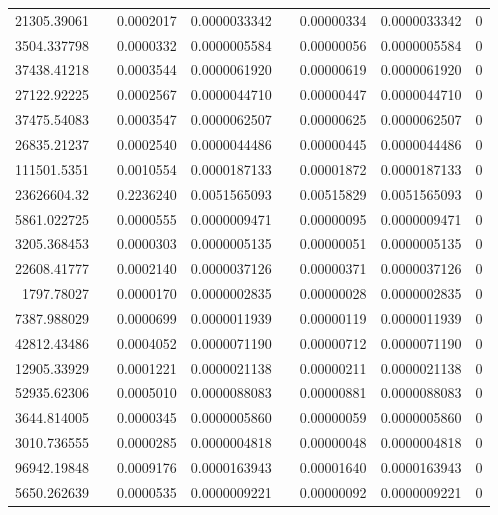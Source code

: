 \documentclass[
journal=jacsat, %
manuscript=article]{achemso}
\begin{document}
\begin{table}[htbp]
{\begin{tabular}{rrrrrrrr}
    21305.39061 &       & 0.0002017 & 0.0000033342 &       & 0.00000334 & 0.0000033342 & 0 \\
    3504.337798 &       & 0.0000332 & 0.0000005584 &       & 0.00000056 & 0.0000005584 & 0 \\
    37438.41218 &       & 0.0003544 & 0.0000061920 &       & 0.00000619 & 0.0000061920 & 0 \\
    27122.92225 &       & 0.0002567 & 0.0000044710 &       & 0.00000447 & 0.0000044710 & 0 \\
    37475.54083 &       & 0.0003547 & 0.0000062507 &       & 0.00000625 & 0.0000062507 & 0 \\
    26835.21237 &       & 0.0002540 & 0.0000044486 &       & 0.00000445 & 0.0000044486 & 0 \\
    111501.5351 &       & 0.0010554 & 0.0000187133 &       & 0.00001872 & 0.0000187133 & 0 \\
    23626604.32 &       & 0.2236240 & 0.0051565093 &       & 0.00515829 & 0.0051565093 & 0 \\
    5861.022725 &       & 0.0000555 & 0.0000009471 &       & 0.00000095 & 0.0000009471 & 0 \\
    3205.368453 &       & 0.0000303 & 0.0000005135 &       & 0.00000051 & 0.0000005135 & 0 \\
    22608.41777 &       & 0.0002140 & 0.0000037126 &       & 0.00000371 & 0.0000037126 & 0 \\
    1797.78027 &       & 0.0000170 & 0.0000002835 &       & 0.00000028 & 0.0000002835 & 0 \\
    7387.988029 &       & 0.0000699 & 0.0000011939 &       & 0.00000119 & 0.0000011939 & 0 \\
    42812.43486 &       & 0.0004052 & 0.0000071190 &       & 0.00000712 & 0.0000071190 & 0 \\
    12905.33929 &       & 0.0001221 & 0.0000021138 &       & 0.00000211 & 0.0000021138 & 0 \\
    52935.62306 &       & 0.0005010 & 0.0000088083 &       & 0.00000881 & 0.0000088083 & 0 \\
    3644.814005 &       & 0.0000345 & 0.0000005860 &       & 0.00000059 & 0.0000005860 & 0 \\
    3010.736555 &       & 0.0000285 & 0.0000004818 &       & 0.00000048 & 0.0000004818 & 0 \\
    96942.19848 &       & 0.0009176 & 0.0000163943 &       & 0.00001640 & 0.0000163943 & 0 \\
    5650.262639 &       & 0.0000535 & 0.0000009221 &       & 0.00000092 & 0.0000009221 & 0 \\

\end{tabular}}
\end{table}
\end{document}
